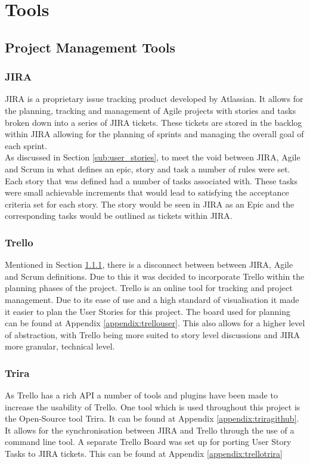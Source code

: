 \newpage
\section{Tools}
\subsection{Project Management Tools}
\subsubsection{JIRA}
\label{sub:JIRA}
JIRA is a proprietary issue tracking product developed by Atlassian. It allows for the planning, tracking and management of Agile projects with stories and tasks broken down into a series of JIRA tickets. These tickets are stored in the backlog within JIRA allowing for the planning of sprints and managing the overall goal of each sprint. 
\\ As discussed in Section \ref{sub:user_stories}, to meet the void between JIRA, Agile and Scrum in what defines an epic, story and task a number of rules were set. Each story that was defined had a number of tasks associated with. These tasks were small achievable increments that would lead to satisfying the acceptance criteria set for each story. The story would be seen in JIRA as an Epic and the corresponding tasks would be outlined as tickets within JIRA. 
\subsubsection{Trello}
\label{sub:trello}
Mentioned in Section \ref{sub:JIRA}, there is a disconnect between between JIRA, Agile and Scrum definitions. Due to this it was decided to incorporate Trello within the planning phases of the project. Trello is an online tool for tracking and project management. Due to its ease of use and a high standard of visualisation it made it easier to plan the User Stories for this project. The board used for planning can be found at Appendix \ref{appendix:trellouser}. This also allows for a higher level of abstraction, with Trello being more suited to story level discussions and JIRA more granular, technical level.
\subsubsection{Trira}
\label{sub:trira}
As Trello has a rich API a number of tools and plugins have been made to increase the usability of Trello. One tool which is used throughout this project is the Open-Source tool Trira. It can be found at Appendix \ref{appendix:triragithub}. It allows for the synchronisation between JIRA and Trello through the use of a command line tool. A separate Trello Board was set up for porting User Story Tasks to JIRA tickets. This can be found at Appendix \ref{appendix:trellotrira}

